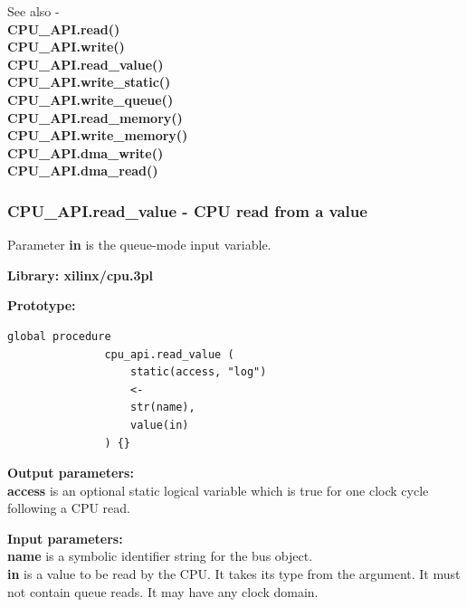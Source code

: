             See also - \\
            {\bf CPU\_API.read()}  \\
            {\bf CPU\_API.write()}  \\
            {\bf CPU\_API.read\_value()}  \\
            {\bf CPU\_API.write\_static()}  \\
            {\bf CPU\_API.write\_queue()}  \\
            {\bf CPU\_API.read\_memory()}  \\
            {\bf CPU\_API.write\_memory()}  \\
            {\bf CPU\_API.dma\_write()}  \\
            {\bf CPU\_API.dma\_read()}  \\




        \subsubsection{CPU\_API.read\_value - CPU read from a
                                                value}\label{sec:lpcpurdvalue}
            Parameter {\bf in} is the queue-mode input variable.

            {\bf Library: xilinx/cpu.3pl}

            {\bf Prototype:} \\
            \vsp
            \begin{lstlisting}[gobble=12, language=threepl]
               global procedure
               cpu_api.read_value (
                   static(access, "log")
                   <-
                   str(name),
                   value(in)
               ) {}
            \end{lstlisting}

            {\bf Output parameters:} \\
            {\bf access} is an optional static logical variable which is true
            for one clock cycle following a CPU read.

            {\bf Input parameters:} \\
            {\bf name} is a symbolic identifier string for the bus object.\\
            {\bf in} is a value to be read by the CPU. It takes its type from
            the argument. It must not contain queue reads. It may have any
            clock domain.
        
